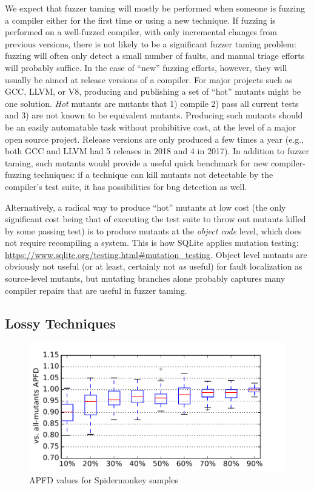 We expect that fuzzer taming will mostly be performed when someone is fuzzing a compiler either for the first time or using a new technique.  If fuzzing is performed on a well-fuzzed compiler, with only incremental changes from previous versions, there is not likely to be a significant fuzzer taming problem:  fuzzing will often only detect a small number of faults, and manual triage efforts will probably suffice.  In the case of ``new'' fuzzing efforts, however, they will usually be aimed at release versions of a compiler.  For major projects such as GCC, LLVM, or V8, producing and publishing a set of ``hot'' mutants might be one solution.  \emph{Hot} mutants are mutants that 1) compile 2) pass all current tests and 3) are not known to be equivalent mutants.  Producing such mutants should be an easily automatable task without prohibitive cost, at the level of a major open source project.  Release versions are only produced a few times a year (e.g., both GCC and LLVM had 5 releases in 2018 and 4 in 2017).  In addition to fuzzer taming, such mutants would provide a useful quick benchmark for new compiler-fuzzing techniques:  if a technique can kill mutants not detectable by the compiler's test suite, it has possibilities for bug detection as well.

Alternatively, a radical way to produce ``hot'' mutants at low cost (the only significant cost being that of executing the test suite to throw out mutants killed by some passing test) is to produce mutants at the \emph{object code} level, which does not require recompiling a system.  This is how SQLite applies mutation testing:  \url{https://www.sqlite.org/testing.html#mutation_testing}.  Object level mutants are obviously not useful (or at least, certainly not \emph{as} useful) for fault localization as source-level mutants, but mutating branches alone probably captures many compiler repairs that are useful in fuzzer taming.

\subsection{Lossy Techniques}

\begin{figure}
  \centering
  \includegraphics[width=0.95\columnwidth]{samplejs}
  \caption{APFD values for Spidermonkey samples}
  \label{samplejs}
\end{figure}%


